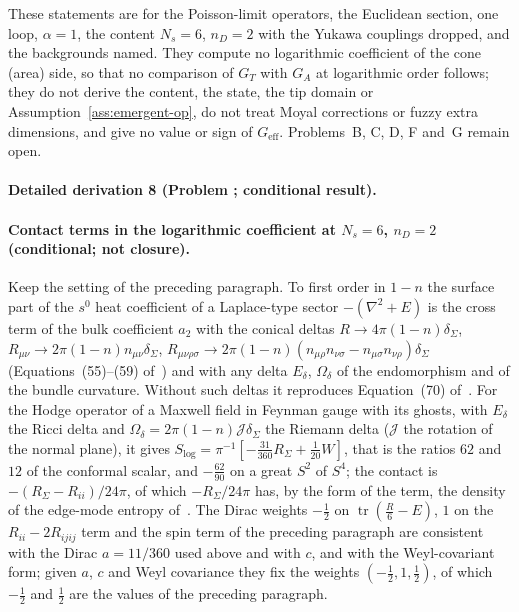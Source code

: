 These statements are for the Poisson-limit operators, the Euclidean section, one loop, \(\alpha=1\), the content \(N_s=6\), \(n_D=2\) with the Yukawa couplings dropped, and the backgrounds named. They compute no logarithmic coefficient of the cone (area) side, so that no comparison of \(G_T\) with \(G_A\) at logarithmic order follows; they do not derive the content, the state, the tip domain or Assumption~\ref{ass:emergent-op}, do not treat Moyal corrections or fuzzy extra dimensions, and give no value or sign of \(G_{\mathrm{eff}}\). Problems~B, C, D, F and~G remain open.



\paragraph{Detailed derivation 8 (Problem ; conditional result).} \label{ref:detail-7} %



\paragraph{Contact terms in the logarithmic coefficient at \(N_s=6\), \(n_D=2\) (conditional; not closure).}

Keep the setting of the preceding paragraph. To first order in \(1-n\) the surface part of the \(s^0\) heat coefficient of a Laplace-type sector \(-(\nabla^2+E)\) is the cross term of the bulk coefficient \(a_2\) with the conical deltas \(R\to4\pi(1-n)\delta_\Sigma\), \(R_{\mu\nu}\to2\pi(1-n)n_{\mu\nu}\delta_\Sigma\), \(R_{\mu\nu\rho\sigma}\to2\pi(1-n)(n_{\mu\rho}n_{\nu\sigma}-n_{\mu\sigma}n_{\nu\rho})\delta_\Sigma\) (Equations~(55)--(59) of~\cite{Solodukhin2011}) and with any delta \(E_\delta\), \(\Omega_\delta\) of the endomorphism and of the bundle curvature. Without such deltas it reproduces Equation~(70) of~\cite{Solodukhin2011}. For the Hodge operator of a Maxwell field in Feynman gauge with its ghosts, with \(E_\delta\) the Ricci delta and \(\Omega_\delta=2\pi(1-n)\mathcal J\delta_\Sigma\) the Riemann delta (\(\mathcal J\) the rotation of the normal plane), it gives \(S_{\log}=\pi^{-1}[-\tfrac{31}{360}R_\Sigma+\tfrac1{20}W]\), that is the ratios \(62\) and \(12\) of the conformal scalar, and \(-\tfrac{62}{90}\) on a great \(S^2\) of \(S^4\); the contact is \(-(R_\Sigma-R_{ii})/24\pi\), of which \(-R_\Sigma/24\pi\) has, by the form of the term, the density of the edge-mode entropy of~\cite{DonnellyWall2016}. The Dirac weights \(-\tfrac12\) on \(\operatorname{tr}(\tfrac R6-E)\), \(1\) on the \(R_{ii}-2R_{ijij}\) term and the spin term of the preceding paragraph are consistent with the Dirac \(a=11/360\) used above and with \(c\), and with the Weyl-covariant form; given \(a\), \(c\) and Weyl covariance they fix the weights \((-\tfrac12,1,\tfrac12)\), of which \(-\tfrac12\) and \(\tfrac12\) are the values of the preceding paragraph.



